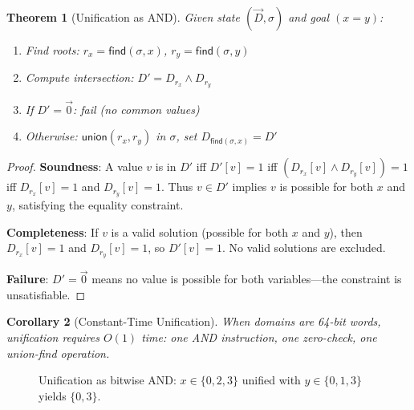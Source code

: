 \documentclass[11pt,a4paper]{article}
\newtheorem{theorem}{Theorem}
\newtheorem{corollary}[theorem]{Corollary}
\begin{document}
\begin{theorem}[Unification as AND]
\label{thm:unify-and}
Given state $(\vec{D}, \sigma)$ and goal $(x = y)$:
\begin{enumerate}
  \item Find roots: $r_x = \textsf{find}(\sigma, x)$, $r_y = \textsf{find}(\sigma, y)$
  \item Compute intersection: $D' = D_{r_x} \land D_{r_y}$
  \item If $D' = \vec{0}$: fail (no common values)
  \item Otherwise: $\textsf{union}(r_x, r_y)$ in $\sigma$, set $D_{\textsf{find}(\sigma,x)} = D'$
\end{enumerate}
\end{theorem}

\begin{proof}
\textbf{Soundness}:
A value $v$ is in $D'$ iff $D'[v] = 1$ iff $(D_{r_x}[v] \land D_{r_y}[v]) = 1$ iff $D_{r_x}[v] = 1$ and $D_{r_y}[v] = 1$.
Thus $v \in D'$ implies $v$ is possible for both $x$ and $y$, satisfying the equality constraint.

\textbf{Completeness}:
If $v$ is a valid solution (possible for both $x$ and $y$), then $D_{r_x}[v] = 1$ and $D_{r_y}[v] = 1$, so $D'[v] = 1$.
No valid solutions are excluded.

\textbf{Failure}:
$D' = \vec{0}$ means no value is possible for both variables---the constraint is unsatisfiable.
\end{proof}

\begin{corollary}[Constant-Time Unification]
When domains are 64-bit words, unification requires $O(1)$ time:
one AND instruction, one zero-check, one union-find operation.
\end{corollary}

\begin{figure}[ht]
\centering
{}
\caption{Unification as bitwise AND: $x \in \{0,2,3\}$ unified with $y \in \{0,1,3\}$ yields $\{0,3\}$.}
\label{fig:unify-and}
\end{figure}
\end{document}
